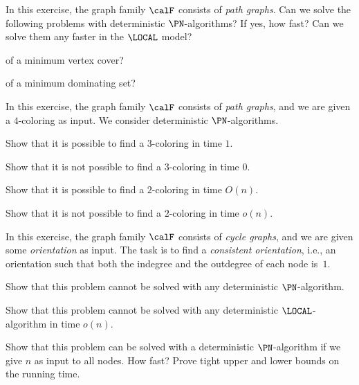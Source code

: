 \begin{ex}[approximation]
    In this exercise, the graph family $\calF$ consists of \emph{path graphs}. Can we solve the following problems with deterministic $\PN$-algorithms? If yes, how fast? Can we solve them any faster in the $\LOCAL$ model?
    \begin{subex}
        \item {} of a minimum vertex cover?
        \item {} of a minimum dominating set?
    \end{subex}
\end{ex}

\begin{ex}
    In this exercise, the graph family $\calF$ consists of \emph{path graphs}, and we are given a $4$-coloring as input. We consider deterministic $\PN$-algorithms.
    \begin{subex}
        \item Show that it is possible to find a $3$-coloring in time $1$.
        \item Show that it is not possible to find a $3$-coloring in time $0$.
        \item Show that it is possible to find a $2$-coloring in time $O(n)$.
        \item Show that it is not possible to find a $2$-coloring in time $o(n)$.
    \end{subex}
\end{ex}

\begin{exs}[orientations]
    In this exercise, the graph family $\calF$ consists of \emph{cycle graphs}, and we are given some \emph{orientation} as input. The task is to find a \emph{consistent orientation}, i.e., an orientation such that both the indegree and the outdegree of each node is~$1$.
    \begin{subex}
        \item Show that this problem cannot be solved with any deterministic $\PN$-algorithm.
        \item Show that this problem cannot be solved with any deterministic $\LOCAL$-algorithm in time $o(n)$.
        \item Show that this problem can be solved with a deterministic $\PN$-algorithm if we give $n$ as input to all nodes. How fast? Prove tight upper and lower bounds on the running time.
    \end{subex}
\end{exs}


